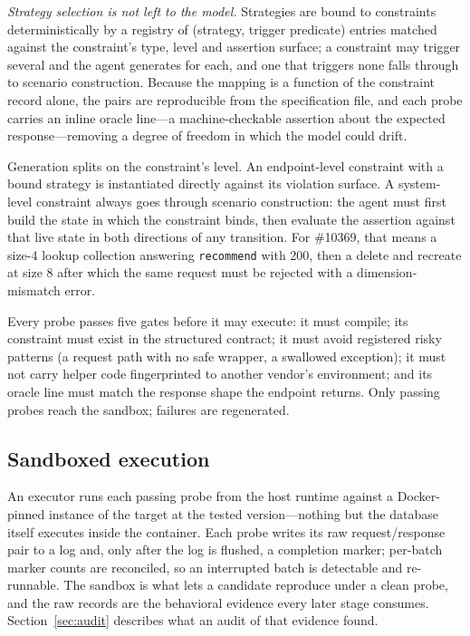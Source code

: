\documentclass[acmsmall,screen,review,anonymous]{acmart}
\begin{document}
\emph{Strategy selection is not left to the model.} Strategies are bound to constraints
deterministically by a registry of (strategy, trigger predicate) entries matched against the
constraint's type, level and assertion surface; a constraint may trigger several and the agent
generates for each, and one that triggers none falls through to scenario construction. Because the
mapping is a function of the constraint record alone, the pairs are reproducible from the
specification file, and each probe carries an inline oracle line---a machine-checkable assertion
about the expected response---removing a degree of freedom in which the model could drift.

Generation splits on the constraint's level. An endpoint-level constraint with a bound strategy is
instantiated directly against its violation surface. A system-level constraint always goes through
scenario construction: the agent must first build the state in which the constraint binds, then
evaluate the assertion against that live state in both directions of any transition. For \#10369,
that means a size-4 lookup collection answering \texttt{recommend} with 200, then a delete and
recreate at size 8 after which the same request must be rejected with a dimension-mismatch error.

Every probe passes five gates before it may execute: it must compile; its constraint must exist in
the structured contract; it must avoid registered risky patterns (a request path with no safe
wrapper, a swallowed exception); it must not carry helper code fingerprinted to another vendor's
environment; and its oracle line must match the response shape the endpoint returns. Only passing
probes reach the sandbox; failures are regenerated.

\subsection{Sandboxed execution}
\label{subsec:execution}

An executor runs each passing probe from the host runtime against a Docker-pinned instance of the
target at the tested version---nothing but the database itself executes inside the container. Each
probe writes its raw request/response pair to a log and, only after the log is flushed, a completion
marker; per-batch marker counts are reconciled, so an interrupted batch is detectable and
re-runnable. The sandbox is what lets a candidate reproduce under a clean probe, and the raw records
are the behavioral evidence every later stage consumes. Section~\ref{sec:audit} describes what an
audit of that evidence found.
\end{document}
